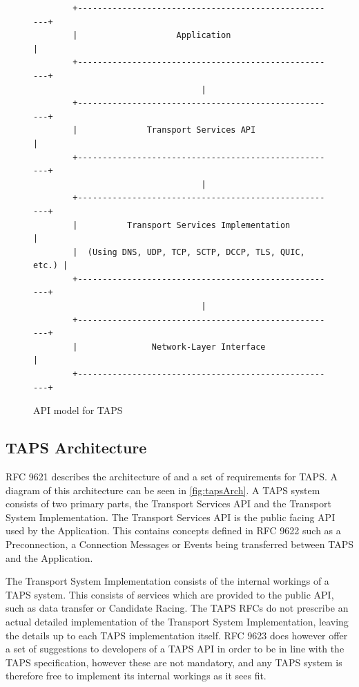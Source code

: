 \begin{figure}[H]
    \centering
    \begin{lstlisting}
        +-----------------------------------------------------+
        |                    Application                      |
        +-----------------------------------------------------+
                                  |
        +-----------------------------------------------------+
        |              Transport Services API                 |
        +-----------------------------------------------------+
                                  |
        +-----------------------------------------------------+
        |          Transport Services Implementation          |
        |  (Using DNS, UDP, TCP, SCTP, DCCP, TLS, QUIC, etc.) |
        +-----------------------------------------------------+
                                  |
        +-----------------------------------------------------+
        |               Network-Layer Interface               |
        +-----------------------------------------------------+
    \end{lstlisting}
    \caption{API model for TAPS \cite{trammellAbstractApplicationProgramming2025}}
\end{figure}

\subsection{TAPS Architecture} \label{sec:tapsArch}
RFC 9621 describes the architecture of and a set of requirements
for TAPS. \cite{paulyArchitectureRequirementsTransport2025}
A diagram of this architecture can be seen in \cref{fig:tapsArch}.
A TAPS system consists of two primary parts, the Transport Services
API and the Transport System Implementation. The Transport Services
API is the public facing API used by the Application. This contains
concepts defined in RFC 9622 such as a Preconnection, a Connection
Messages or Events being transferred between TAPS and the Application.

The Transport System Implementation consists of the internal workings
of a TAPS system. This consists of services which are provided to the
public API, such as data transfer or Candidate Racing. The TAPS RFCs
do not prescribe an actual detailed implementation of the Transport
System Implementation, leaving the details up to each TAPS implementation
itself. RFC 9623 does however offer a set of suggestions to developers
of a TAPS API in order to be in line with the TAPS specification,
however these are not mandatory, and any TAPS system is therefore
free to implement its internal workings as it sees fit.


